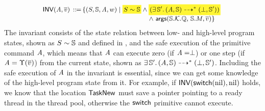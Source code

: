 \[
    \small
    \begin{array}{l}
        \!\!
        \INV{(\primcom, \args{\val})} \, \define \,
        \{
            (\state, \hpstate, \primcom, \word) \sepline
            \colorbox{yellow!80}{\!$\stateRel{\state}{\hpstate}$\!}
            \land
            \colorbox{yellow!80}
            {\!\!\!
                $(\exists \, \hpstate'. \,
                \primMultiTrans
                    {(\primcom, \hpstate)}
                    {*}{(\primdone, \hpstate')})$
            \!\!\!} \\
            \hspace*{15.8em}
            \land \
            \arguments(\hpstate.\hthrdlocalst.\hRstate, \,
            \hpstate.\Mem, \args{\val})
        \}
    \end{array}
\]
The invariant consists of the state relation between low- and
high-level program states,
shown as ${S} \sim {\mathbb{S}}$
and defined in \Subsec{\ref{subsec:correctness-primitive}}, 
and the safe execution of the primitive 
command $\textit{A}$, which means that 
$\textit{A}$ can execute 
zero (if $\textit{A} = \perp$)
or one step (if $\textit{A} = \Upsilon(\overline{v})$) 
from the current state, shown as 
$\exists \, \mathbb{S}'. \,
    {(\textit{A}, \mathbb{S})} \dashrightarrow^{*} {(\perp, \mathbb{S}')}$. 
Including the safe execution of
$\textit{A}$ in the invariant is essential, 
since we can get some knowledge of the high-level program
state from it.
For example, if $\textsf{INV}{(\mathsf{switch}(\text{nil}), \text{nil})}$
holds, we know that the location $\mathsf{TaskNew}$
must save a pointer pointing to a ready thread
in the thread pool, otherwise the $\mathsf{switch}$ primitive cannot execute.
